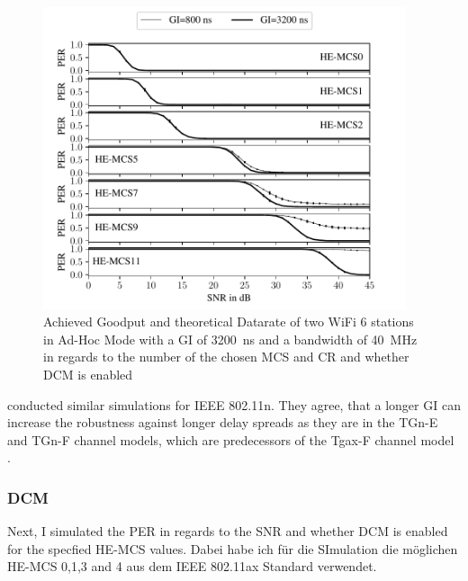 \begin{figure}[H]%
	\centering
	\includegraphics[width=0.95\textwidth]{figures/GI_PER_to_SNR.pdf}
	\caption{Achieved Goodput and theoretical Datarate of two WiFi 6 stations in Ad-Hoc Mode with a \ac{GI} of \SI{3200}{\nano\second} and a bandwidth of \SI{40}{\mega\hertz} in regards to the number of the chosen \ac{MCS} and \ac{CR} and whether \ac{DCM} is enabled}%
	\label{fig:PER_SNR_GI}%
\end{figure}
\textcite{patil_ieee_2020} conducted similar simulations for IEEE 802.11n. They agree, that a longer \ac{GI} can increase the robustness against longer delay spreads as they are in the TGn-E and TGn-F channel models,
which are predecessors of the Tgax-F channel model \cite{TGAXCHANNEL}.

\subsubsection*{\acf{DCM}}
Next, I simulated the \ac{PER} in regards to the \ac{SNR}  and whether \ac{DCM} is enabled for the specfied HE-\ac{MCS} values. Dabei habe ich für die SImulation die möglichen
HE-MCS \num{0},\num{1},\num{3} and \num{4} aus dem IEEE 802.11ax Standard verwendet.

